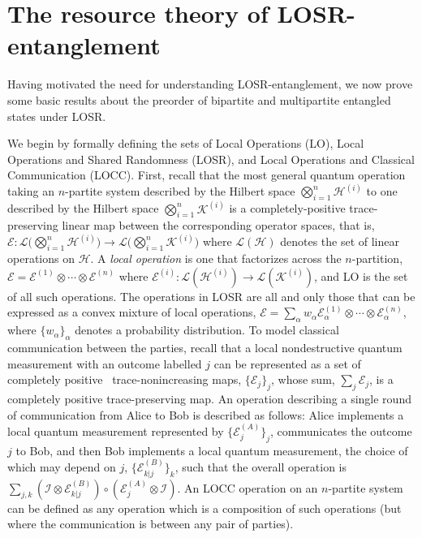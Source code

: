\documentclass[prx,11pt,letterpaper,twocolumn,accepted=2023-11-27]{quantumarticle}
\theoremstyle{plain}
\theoremstyle{definition}
\begin{document}
\section{The resource theory of LOSR-entanglement}\label{sec:RTLOSR}


Having motivated the need for understanding LOSR-entanglement, we now prove some basic results about the preorder of bipartite and multipartite entangled states under LOSR. 

We begin by formally defining the sets of Local Operations (LO), Local Operations and Shared Randomness (LOSR), and Local Operations and Classical Communication (LOCC).
First, recall that the most general quantum operation taking an $n$-partite system described by the Hilbert space $\bigotimes_{i=1}^{n} \mathcal{H}^{(i)}$ to one described by the Hilbert space $\bigotimes_{i=1}^{n} \mathcal{K}^{(i)}$ is a completely-positive trace-preserving linear map between the corresponding operator spaces, that is, $\mathcal{E}: \mathcal{L}\big( \bigotimes_{i=1}^{n} \mathcal{H}^{(i)}\big) \to  \mathcal{L}\big( \bigotimes_{i=1}^{n} \mathcal{K}^{(i)}\big)$ where $\mathcal{L}(\mathcal{H})$ denotes the set of linear operations on  $\mathcal{H}$. 
A {\em local operation} is one that factorizes across the $n$-partition, 
$\mathcal{E}=
\mathcal{E}^{(1)}\otimes \cdots \otimes \mathcal{E}^{(n)}$
 where  $\mathcal{E}^{(i)} :  \mathcal{L}(\mathcal{H}^{(i)}) \to \mathcal{L}(\mathcal{K}^{(i)})$, and LO is the set of all such operations.  The operations in LOSR  are all and only those that can be expressed as a convex mixture of local operations, $\mathcal{E}=\sum_{\alpha} w_{\alpha} \mathcal{E}_{\alpha}^{(1)}\otimes \cdots \otimes \mathcal{E}_{\alpha}^{(n)}$,
   where $\{w_{\alpha}\}_{\alpha}$ denotes a probability distribution.  
To model classical communication between the parties, recall that a local nondestructive quantum measurement with an outcome labelled $j$ can be represented as a set of completely positive~\cite{NielsenAndChuang,PhysRevA.100.022112} trace-nonincreasing maps, $\{ \mathcal{E}_j\}_j$, whose sum, $\sum_j  \mathcal{E}_j$,  is a completely positive trace-preserving map.  An operation describing a single round of communication from Alice to Bob is described as follows: Alice implements a local quantum measurement represented by $\{ \mathcal{E}^{(A)}_j\}_j$, communicates the outcome $j$ to Bob, and then Bob implements a local quantum measurement, the choice of which may depend on $j$,  $\{ \mathcal{E}^{(B)}_{k|j}\}_k$, such that the overall operation is $\sum_{j,k} \left(  \mathcal{I} \otimes \mathcal{E}^{(B)}_{k|j} \right) \circ \left( \mathcal{E}^{(A)}_j \otimes \mathcal{I} \right)$.  An LOCC operation on an $n$-partite system can be defined as any operation which is a composition of such operations (but where the communication is between any pair of parties). 
\end{document}

